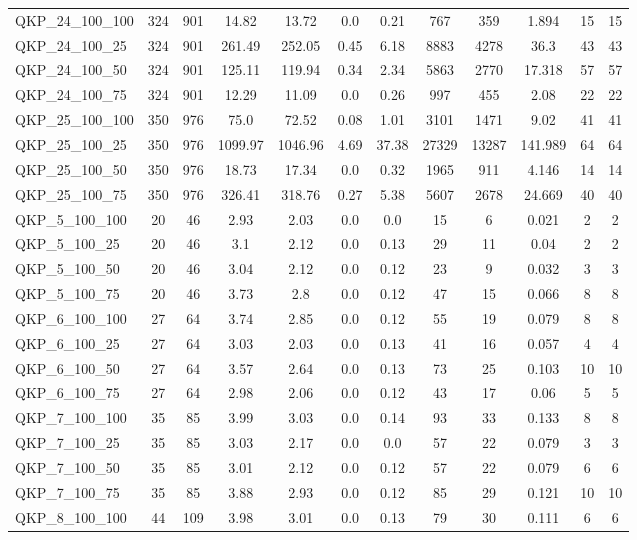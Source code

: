\begin{table}[!h]
{\begin{tabular}{lccccccccccc}
QKP\_24\_100\_100 & 324 & 901 & 14.82 & 13.72 & 0.0 & 0.21 & 767 & 359 & 1.894 & 15 & 15\\
QKP\_24\_100\_25 & 324 & 901 & 261.49 & 252.05 & 0.45 & 6.18 & 8883 & 4278 & 36.3 & 43 & 43\\
QKP\_24\_100\_50 & 324 & 901 & 125.11 & 119.94 & 0.34 & 2.34 & 5863 & 2770 & 17.318 & 57 & 57\\
QKP\_24\_100\_75 & 324 & 901 & 12.29 & 11.09 & 0.0 & 0.26 & 997 & 455 & 2.08 & 22 & 22\\
QKP\_25\_100\_100 & 350 & 976 & 75.0 & 72.52 & 0.08 & 1.01 & 3101 & 1471 & 9.02 & 41 & 41\\
QKP\_25\_100\_25 & 350 & 976 & 1099.97 & 1046.96 & 4.69 & 37.38 & 27329 & 13287 & 141.989 & 64 & 64\\
QKP\_25\_100\_50 & 350 & 976 & 18.73 & 17.34 & 0.0 & 0.32 & 1965 & 911 & 4.146 & 14 & 14\\
QKP\_25\_100\_75 & 350 & 976 & 326.41 & 318.76 & 0.27 & 5.38 & 5607 & 2678 & 24.669 & 40 & 40\\
QKP\_5\_100\_100 & 20 & 46 & 2.93 & 2.03 & 0.0 & 0.0 & 15 & 6 & 0.021 & 2 & 2\\
QKP\_5\_100\_25 & 20 & 46 & 3.1 & 2.12 & 0.0 & 0.13 & 29 & 11 & 0.04 & 2 & 2\\
QKP\_5\_100\_50 & 20 & 46 & 3.04 & 2.12 & 0.0 & 0.12 & 23 & 9 & 0.032 & 3 & 3\\
QKP\_5\_100\_75 & 20 & 46 & 3.73 & 2.8 & 0.0 & 0.12 & 47 & 15 & 0.066 & 8 & 8\\
QKP\_6\_100\_100 & 27 & 64 & 3.74 & 2.85 & 0.0 & 0.12 & 55 & 19 & 0.079 & 8 & 8\\
QKP\_6\_100\_25 & 27 & 64 & 3.03 & 2.03 & 0.0 & 0.13 & 41 & 16 & 0.057 & 4 & 4\\
QKP\_6\_100\_50 & 27 & 64 & 3.57 & 2.64 & 0.0 & 0.13 & 73 & 25 & 0.103 & 10 & 10\\
QKP\_6\_100\_75 & 27 & 64 & 2.98 & 2.06 & 0.0 & 0.12 & 43 & 17 & 0.06 & 5 & 5\\
QKP\_7\_100\_100 & 35 & 85 & 3.99 & 3.03 & 0.0 & 0.14 & 93 & 33 & 0.133 & 8 & 8\\
QKP\_7\_100\_25 & 35 & 85 & 3.03 & 2.17 & 0.0 & 0.0 & 57 & 22 & 0.079 & 3 & 3\\
QKP\_7\_100\_50 & 35 & 85 & 3.01 & 2.12 & 0.0 & 0.12 & 57 & 22 & 0.079 & 6 & 6\\
QKP\_7\_100\_75 & 35 & 85 & 3.88 & 2.93 & 0.0 & 0.12 & 85 & 29 & 0.121 & 10 & 10\\
QKP\_8\_100\_100 & 44 & 109 & 3.98 & 3.01 & 0.0 & 0.13 & 79 & 30 & 0.111 & 6 & 6\\

\end{tabular}}
\end{table}
